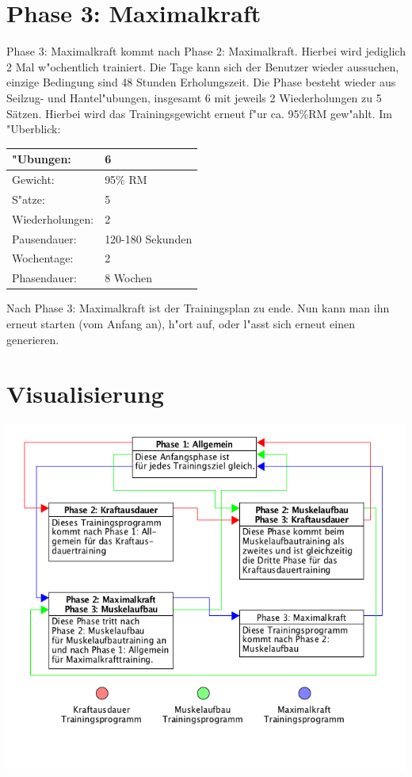 \documentclass[a4paper,12pt]{article}
\begin{document}
	\section{Phase 3: Maximalkraft}
	Phase 3: Maximalkraft kommt nach Phase 2: Maximalkraft. Hierbei wird jediglich 2 Mal w"ochentlich trainiert. Die Tage kann sich der Benutzer wieder aussuchen, einzige Bedingung sind 48 Stunden Erholungszeit. 
	Die Phase besteht wieder aus Seilzug- und Hantel"ubungen, insgesamt 6 mit jeweils 2 Wiederholungen zu 5 Sätzen. Hierbei wird das Trainingsgewicht erneut f"ur ca. 95\%RM gew"ahlt.
	\newline
	Im "Uberblick: 
		\begin{center}
			\begin{tabular}{| l | l |}
				\hline
				"Ubungen: & 6 \\ \hline 
				Gewicht: & 95\% RM \\ \hline
				S"atze: & 5 \\ \hline
				Wiederholungen: & 2 \\ \hline
				Pausendauer: & 120-180 Sekunden \\ \hline
				Wochentage: & 2 \\ \hline
				Phasendauer: & 8 Wochen \\ \hline
			\end{tabular} 
		\end{center}
	Nach Phase 3: Maximalkraft ist der Trainingsplan zu ende. Nun kann man ihn erneut starten (vom Anfang an), h"ort auf, oder l"asst sich erneut einen generieren.
	
	\section{Visualisierung}
	\begin{center}
		\includegraphics[scale=0.4]{img/VisualisierungTrainingsplan}
	\end{center}
	
\end{document}
